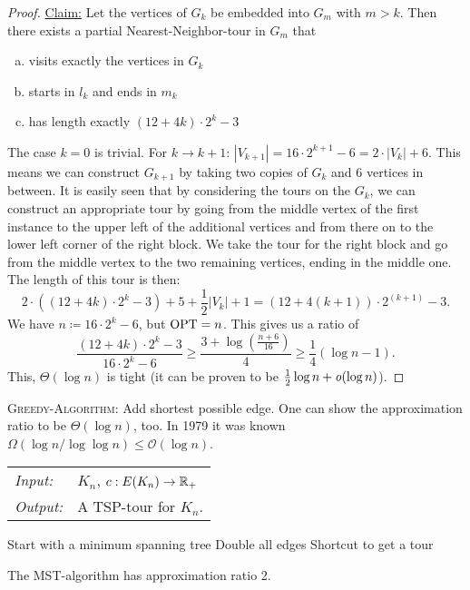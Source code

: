 \documentclass[../skript.tex]{subfiles}
\begin{document}
\begin{proof}
\underline{Claim:} Let the vertices of $G_k$ be embedded into $G_m$ with $m > k$. Then there exists a partial Nearest-Neighbor-tour in $G_m$ that
\begin{enumerate}[(a)]
\item visits exactly the vertices in $G_k$
\item starts in $l_k$ and ends in $m_k$
\item has length exactly $(12 + 4k) \cdot 2^k - 3$
\end{enumerate}
The case $k = 0$ is trivial. For $k \to k + 1$: $|V_{k+1}| = 16 \cdot 2^{k+1} - 6 = 2 \cdot |V_k| + 6$. This means we can construct $G_{k+1}$ by taking two copies of $G_k$ and 6 vertices in between. It is easily seen that by considering the tours on the $G_k$, we can construct an appropriate tour by going from the middle vertex of the first instance to the upper left of the additional vertices and from there on to the lower left corner of the right block. We take the tour for the right block and go from the middle vertex to the two remaining vertices, ending in the middle one.
The length of this tour is then:
\[
	2 \cdot \left( (12 + 4k) \cdot 2^k - 3 \right) + 5 + \frac{1}{2} |V_k| + 1 = (12 + 4{(k+1)}) \cdot 2^{(k+1)} - 3.
\]
We have $n \coloneqq 16 \cdot 2^k - 6$, but $\operatorname{OPT} = n$. This gives us a ratio of
\[
	\frac{(12 + 4k) \cdot 2^k -3}{16 \cdot 2^k - 6} \geq \frac{3 + \log \left( \frac{n+6}{16} \right)}{4} \geq \frac{1}{4} \left( \log n - 1 \right).
\]
This, $\Theta(\log n)$ is tight (it can be proven to be $\frac{1}{2} \log n + \mathit{o}(\log n)$).
\end{proof}
\begin{remark}
\textsc{Greedy-Algorithm:} Add shortest possible edge. One can show the approximation ratio to be $\Theta(\log n)$, too. In 1979 it was known $\Omega(\log n/\log \log n) \leq \mathcal{O}(\log n)$.
\end{remark}
\begin{samepage}
\begin{algorithmbox}
\begin{tabular}{@{}ll}
\textit{Input:} & $K_n$, $c : E(K_n) \to \mathbb{R}_+$\\
\textit{Output:} & A TSP-tour for $K_n$.
\end{tabular}
\end{algorithmbox}
\vspace{-7pt}
\begin{algorithm}[H]
Start with a minimum spanning tree\;
Double all edges\;
Shortcut to get a tour\;
\end{algorithm}
\vspace{-7pt}
\EndAlgorithmLine
\end{samepage}
\begin{theorem} %
\label{thm:87}
The MST-algorithm has approximation ratio 2.
\end{theorem}
\end{document}
